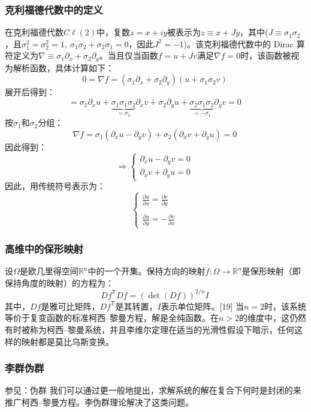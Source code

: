 \subsubsection{克利福德代数中的定义}  
在克利福德代数\({\displaystyle C\ell (2)}\)中，复数\({\displaystyle z=x+iy}\)被表示为\({\displaystyle z\equiv x+Jy}\)，其中(\({\displaystyle J\equiv \sigma_1\sigma_2}\)，且\({\displaystyle \sigma_1^2=\sigma_2^2=1,\ \sigma_1\sigma_2+\sigma_2\sigma_1=0}\)，因此\({\displaystyle J^2=-1}\))。该克利福德代数中的 Dirac 算符定义为\({\displaystyle \nabla \equiv \sigma_1\partial_x + \sigma_2\partial_y}\)。当且仅当函数\({\displaystyle f=u+Jv}\)满足\({\displaystyle \nabla f=0}\)时，该函数被视为解析函数，具体计算如下：
\[
0 = \nabla f = (\sigma_1 \partial_x + \sigma_2 \partial_y)(u + \sigma_1\sigma_2 v)~
\]
展开后得到：
\[
= \sigma_1 \partial_x u + \underbrace{\sigma_1 \sigma_1 \sigma_2}_{=\sigma_2} \partial_x v + \sigma_2 \partial_y u + \underbrace{\sigma_2 \sigma_1 \sigma_2}_{=-\sigma_1} \partial_y v = 0~
\]
按\({\displaystyle \sigma_1}\)和\({\displaystyle \sigma_2}\)分组：
\[
\nabla f = \sigma_1 (\partial_x u - \partial_y v) + \sigma_2 (\partial_x v + \partial_y u) = 0~
\]
因此得到：
\[
\Rightarrow \begin{cases} \partial_x u - \partial_y v = 0 \\ \partial_x v + \partial_y u = 0 \end{cases}~
\]
因此，用传统符号表示为：
\[
\begin{cases} \frac{\partial u}{\partial x} = \frac{\partial v}{\partial y} \\\\ \frac{\partial u}{\partial y} = - \frac{\partial v}{\partial x} \end{cases}~
\]
\subsubsection{高维中的保形映射}  
设\(\Omega\)是欧几里得空间\({\displaystyle \mathbb {R} ^{n}}\)中的一个开集。保持方向的映射\({\displaystyle f:\Omega \to \mathbb {R} ^{n}}\)是保形映射（即保持角度的映射）的方程为：
\[
D f^{\mathsf{T}} D f = (\det(Df))^{2/n} I~
\]
其中，\({\displaystyle Df}\)是雅可比矩阵，\({\displaystyle Df^{\mathsf{T}}}\)是其转置，\({\displaystyle I}\)表示单位矩阵。[19] 当\(n = 2\)时，该系统等价于复变函数的标准柯西–黎曼方程，解是全纯函数。在\(n > 2\)的维度中，这仍然有时被称为柯西–黎曼系统，并且李维尔定理在适当的光滑性假设下暗示，任何这样的映射都是莫比乌斯变换。
\subsubsection{李群伪群}  
参见：伪群  
我们可以通过更一般地提出，求解系统的解在复合下何时是封闭的来推广柯西–黎曼方程。李伪群理论解决了这类问题。
